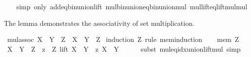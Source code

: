 \begin{isabellebody}
%
\isadelimproof
\ \ %
\endisadelimproof
%
\isatagproof
{}\isamarkupfalse%
\ {\isacharparenleft}{\kern0pt}simp\ only{\isacharcolon}{\kern0pt}\ add{\isacharunderscore}{\kern0pt}eq{\isacharunderscore}{\kern0pt}bin{\isacharunderscore}{\kern0pt}union{\isacharunderscore}{\kern0pt}lift\ mul{\isacharunderscore}{\kern0pt}bin{\isacharunderscore}{\kern0pt}union{\isacharunderscore}{\kern0pt}eq{\isacharunderscore}{\kern0pt}bin{\isacharunderscore}{\kern0pt}union{\isacharunderscore}{\kern0pt}mul\ mul{\isacharunderscore}{\kern0pt}lift{\isacharunderscore}{\kern0pt}eq{\isacharunderscore}{\kern0pt}lift{\isacharunderscore}{\kern0pt}mul{\isacharunderscore}{\kern0pt}mul{\isacharparenright}{\kern0pt}%
\endisatagproof
{\isafoldproof}%
%
\isadelimproof
%
\endisadelimproof
%
\begin{isamarkuptext}%
The lemma demonstrates the associativity of set multiplication.%
\end{isamarkuptext}\isamarkuptrue%
\isamarkupfalse%
\ mul{\isacharunderscore}{\kern0pt}assoc{\isacharcolon}{\kern0pt}\ {\isachardoublequoteopen}{\isacharparenleft}{\kern0pt}X\ {\isacharasterisk}{\kern0pt}\ Y{\isacharparenright}{\kern0pt}\ {\isacharasterisk}{\kern0pt}\ Z\ {\isacharequal}{\kern0pt}\ X\ {\isacharasterisk}{\kern0pt}\ {\isacharparenleft}{\kern0pt}Y\ {\isacharasterisk}{\kern0pt}\ Z{\isacharparenright}{\kern0pt}{\isachardoublequoteclose}\isanewline
%
\isadelimproof
%
\endisadelimproof
%
\isatagproof
{}\isamarkupfalse%
\ {\isacharparenleft}{\kern0pt}induction\ Z\ rule{\isacharcolon}{\kern0pt}\ mem{\isacharunderscore}{\kern0pt}induction{\isacharparenright}{\kern0pt}\isanewline
\ \ \isamarkupfalse%
\ {\isacharparenleft}{\kern0pt}mem\ Z{\isacharparenright}{\kern0pt}\isanewline
\ \ \isamarkupfalse%
\ {\isachardoublequoteopen}{\isacharparenleft}{\kern0pt}X\ {\isacharasterisk}{\kern0pt}\ Y{\isacharparenright}{\kern0pt}\ {\isacharasterisk}{\kern0pt}\ Z\ {\isacharequal}{\kern0pt}\ {\isacharparenleft}{\kern0pt}{\isasymUnion}z\ {\isasymin}\ Z{\isachardot}{\kern0pt}\ lift\ {\isacharparenleft}{\kern0pt}{\isacharparenleft}{\kern0pt}X\ {\isacharasterisk}{\kern0pt}\ Y{\isacharparenright}{\kern0pt}\ {\isacharasterisk}{\kern0pt}\ z{\isacharparenright}{\kern0pt}\ {\isacharparenleft}{\kern0pt}X\ {\isacharasterisk}{\kern0pt}\ Y{\isacharparenright}{\kern0pt}{\isacharparenright}{\kern0pt}{\isachardoublequoteclose}\isanewline
\ \ \ \ \isamarkupfalse%
\ {\isacharparenleft}{\kern0pt}subst\ mul{\isacharunderscore}{\kern0pt}eq{\isacharunderscore}{\kern0pt}idx{\isacharunderscore}{\kern0pt}union{\isacharunderscore}{\kern0pt}lift{\isacharunderscore}{\kern0pt}mul{\isacharparenright}{\kern0pt}\ simp\isanewline

\end{isabellebody}
